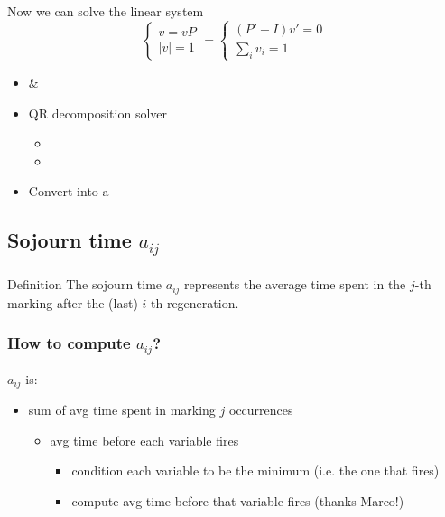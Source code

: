 \begin{frame}
  Now we can solve the linear system
  \begin{equation*}
    \begin{cases}
      v=vP\\
      |v| = 1
    \end{cases}
    =
    \begin{cases}
      (P'-I)v'=0\\
      \sum_i v_i = 1
    \end{cases}
  \end{equation*}
  \begin{itemize}
  \item {} \& 
  \item QR decomposition solver
    \begin{itemize}\tiny
    \item {}
    \item {}
    \end{itemize}
  \item Convert  into a 
  \end{itemize}
\end{frame}

\subsection{Sojourn time $a_{ij}$}
\begin{frame}
  \frametitle{\insertsubsection}
  \begin{block}{Definition}
    The sojourn time \alert{$a_{ij}$} represents the average time spent in the
    \alert{$j$-th marking} after the (last) \alert{$i$-th regeneration}.
  \end{block}
\end{frame}

\begin{frame}
  \frametitle{How to compute $a_{ij}$?}
  $a_{ij}$ is:
  \begin{itemize}
  \item sum of avg time spent in marking $j$ occurrences
    \begin{itemize}
    \item avg time before each variable fires
      \begin{itemize}
      \item condition each variable to be the minimum (i.e. the one
        that fires)
      \item compute avg time before that variable fires (thanks Marco!)
      \end{itemize}
    \end{itemize}
  \end{itemize}
\end{frame}

